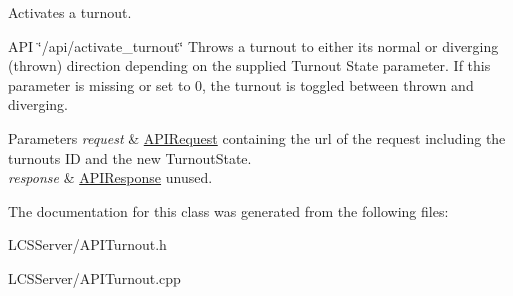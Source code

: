 Activates a turnout. 

A\+PI \char`\"{}/api/activate\+\_\+turnout\char`\"{} Throws a turnout to either its normal or diverging (thrown) direction depending on the supplied Turnout State parameter. If this parameter is missing or set to 0, the turnout is toggled between thrown and diverging. 
\begin{DoxyParams}{Parameters}
{\em request} & \hyperlink{class_a_p_i_request}{A\+P\+I\+Request} containing the url of the request including the turnout\textquotesingle{}s ID and the new Turnout\+State. \\
\hline
{\em response} & \hyperlink{class_a_p_i_response}{A\+P\+I\+Response} unused. \\
\hline
\end{DoxyParams}


The documentation for this class was generated from the following files\+:\begin{DoxyCompactItemize}
\item 
L\+C\+S\+Server/A\+P\+I\+Turnout.\+h\item 
L\+C\+S\+Server/A\+P\+I\+Turnout.\+cpp\end{DoxyCompactItemize}
